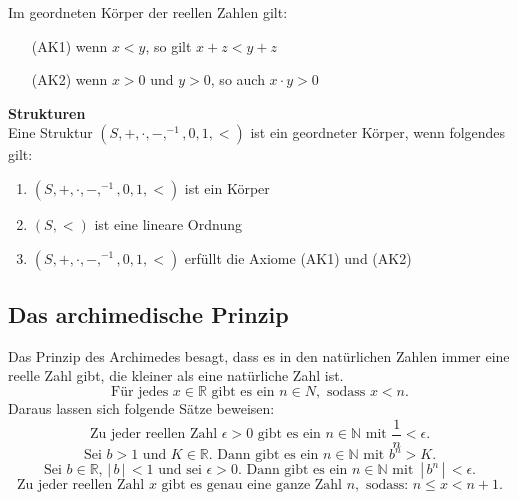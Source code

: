 \documentclass[a4paper,12pt]{article}
\numberwithin{equation}{section}
\begin{document}
Im geordneten Körper der reellen Zahlen gilt:
\begin{enumerate}[wide,label=]
        \item[(AK1)] wenn $x<y$, so gilt $x+z<y+z$ 
        \item[(AK2)] wenn $x>0$ und $y>0$, so auch $x\cdot y>0$ 
\end{enumerate}
\textbf{Strukturen}\\
Eine Struktur $\left( S,+,\cdot ,-,^{-1},0,1,<\right) $ ist ein geordneter Körper, wenn folgendes gilt:
\begin{enumerate}[wide,label=(\alph*)]
        \item $\left( S,+,\cdot ,-,^{-1},0,1,<\right) $ ist ein Körper
        \item $\left( S,<\right) $ ist eine lineare Ordnung
        \item $\left( S,+,\cdot ,-,^{-1},0,1,<\right) $ erfüllt die Axiome (AK1) und (AK2)
\end{enumerate}

\subsection{Das archimedische Prinzip}
Das Prinzip des Archimedes besagt, dass es in den natürlichen Zahlen immer eine reelle Zahl gibt, die kleiner als eine natürliche Zahl ist.
\[ 
\text{Für jedes }x \in \mathbb{R} \text{ gibt es ein }n  \in N,\text{ sodass }x<n
.\] 
Daraus lassen sich folgende Sätze beweisen:
\[ 
\text{Zu jeder reellen Zahl }\epsilon>0\text{ gibt es ein }n  \in \mathbb{N}\text{ mit }\dfrac{1}{n}<\epsilon
.\] 
\[ 
\text{Sei }b>1\text{ und }K \in \mathbb{R}.\text{ Dann gibt es ein }n  \in \mathbb{N}\text{ mit }b^{n}>K
.\] 
\[ 
\text{Sei }b \in \mathbb{R},\,|\, b\,|\, <1\text{ und sei }\epsilon>0.\text{ Dann gibt es ein }n  \in \mathbb{N} \text{ mit }\,|\, b^{n}\,|\, <\epsilon
.\] 
\[ 
\text{Zu jeder reellen Zahl }x\text{ gibt es genau eine ganze Zahl }n,\text{ sodass: }n\leq x<n+1
.\] 
\end{document}
